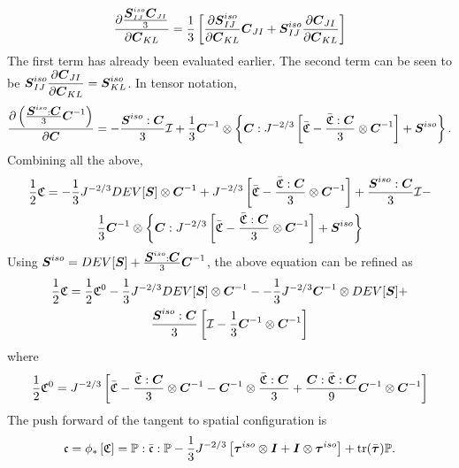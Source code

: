 \documentclass[11pt,a4paper]{article}
\newcommand{\parder}[2]{{\dfrac{\partial #1}{\partial #2}}}
\begin{document}
\begin{gather}
 	\parder{\frac{\bfS^{iso}_{IJ}\bfC_{JI}}{3}}{\bfC_{KL}} = \frac{1}{3} \left[  \parder{\bfS^{iso}_{IJ}}{\bfC_{KL}} \bfC_{JI} +  \bfS^{iso}_{IJ}  \parder{\bfC_{JI}}{\bfC_{KL}}   \right] 
\end{gather}
The first term has already been evaluated earlier. The second term can be seen to be $\bfS^{iso}_{IJ}  \parder{\bfC_{JI}}{\bfC_{KL}} = \bfS^{iso}_{KL}$. In tensor notation,
\begin{equation}
\parder{\left( \frac{\bfS^{iso}:\bfC}{3}\bfC^{-1} \right)}{\bfC} = -\frac{\bfS^{iso}:\bfC}{3} \mathcal{I}  + \frac{1}{3} \bfCinv \otimes \left\lbrace   \bfC:J^{-2/3} \left[\bar{\mathfrak{C}} - \frac{\bar{\mathfrak{C}}:\bfC}{3}\otimes\bfCinv  \right]  + \bfS^{iso}       \right\rbrace.
\end{equation}
Combining all the above,
\begin{multline}
\frac{1}{2}\mathfrak{C} = -\frac{1}{3} J^{-2/3} DEV[\mbox{\boldmath $S$}]  \otimes {\mbox{\boldmath $C$}^{-1}} + J^{-2/3}\left[\bar{\mathfrak{C}}- \frac{\bar{\mathfrak{C}}: \mbox{\boldmath $C$}}{3}  \otimes \mbox{\boldmath $C$}^{-1} \right] +\frac{\mbox{\boldmath $S$}^{iso}:\mbox{\boldmath $C$}}{3} \mathcal{I}  - \\
\frac{1}{3} {\mbox{\boldmath $C$}}^{-1} \otimes \left\lbrace   \mbox{\boldmath $C$}:J^{-2/3} \left[\bar{\mathfrak{C}} - \frac{\bar{\mathfrak{C}}:\mbox{\boldmath $C$}}{3}\otimes{\mbox{\boldmath $C$}}^{-1}  \right]  + \mbox{\boldmath $S$}^{iso}       \right\rbrace
\end{multline}
Using $\mbox{\boldmath $S$}^{iso} = DEV[\mbox{\boldmath $S$}] + \frac{\mbox{\boldmath $S$}^{iso}:\mbox{\boldmath $C$}}{3} {\mbox{\boldmath $C$}}^{-1}$, the above equation can be refined as 
\begin{multline}
\frac{1}{2}\mathfrak{C} = \frac{1}{2}\mathfrak{C}^0-\frac{1}{3} J^{-2/3} DEV[\mbox{\boldmath $S$}]  \otimes {\mbox{\boldmath $C$}}^{-1} - -\frac{1}{3}J^{-2/3} {\mbox{\boldmath $C$}}^{-1} \otimes  DEV[\mbox{\boldmath $S$}]  + \\
\frac{\mbox{\boldmath $S$}^{iso}:\mbox{\boldmath $C$}}{3}\left[ \mathcal{I} - \frac{1}{3} {\mbox{\boldmath $C$}}^{-1} \otimes {\mbox{\boldmath $C$}}^{-1} \right]
\end{multline}
where
\begin{equation}
\frac{1}{2}\mathfrak{C}^0=   J^{-2/3}\left[\bar{\mathfrak{C}} - \frac{\bar{\mathfrak{C}}: \mbox{\boldmath $C$}}{3}  \otimes \mbox{\boldmath $C$}^{-1} - {\mbox{\boldmath $C$}}^{-1} \otimes \frac{\bar{\mathfrak{C}}: \mbox{\boldmath $C$}}{3} + \frac{\mbox{\boldmath $C$}:\bar{\mathfrak{C}} :\mbox{\boldmath $C$}}{9}  {\mbox{\boldmath $C$}}^{-1} \otimes {\mbox{\boldmath $C$}}^{-1} \right] 
\end{equation}
The push forward of the tangent to spatial configuration is
\begin{equation}
 \mathfrak{c} = \phi_* \left[\mathfrak{C} \right] =  \mathbb{P}:\bar{\mathfrak{c}}:\mathbb{P} - \frac{1}{3} J^{-2/3} \left[{\mbox{\boldmath $\tau$}}^{iso} \otimes \mbox{\boldmath $I$}  +\mbox{\boldmath $I$} \otimes  {\mbox{\boldmath $\tau$}}^{iso} \right] + \text{tr}(\bar{\mbox{\boldmath $\tau$}}) \mathbb{P}.
\end{equation}
\end{document}
